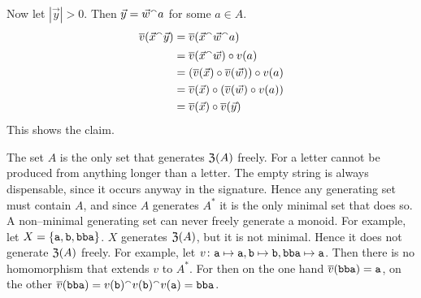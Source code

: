 Now let $|\vec{y}| > 0$. Then $\vec{y} = \vec{w} {^{\smallfrown}} a$
for some $a \in A$.
\begin{equation}
\begin{split}
\overline{v}(\vec{x} {^{\smallfrown}} \vec{y}) & = \overline{v}(\vec{x} {^{\smallfrown}} \vec{w} {^{\smallfrown}} a) \\
               &  = \overline{v}(\vec{x} {^{\smallfrown}} \vec{w}) \circ v(a) \\
               &  = (\overline{v}(\vec{x}) \circ \overline{v}(\vec{w})) \circ v(a) \\
               &  = \overline{v}(\vec{x}) \circ (\overline{v}(\vec{w}) \circ v(a)) \\
               &  = \overline{v}(\vec{x}) \circ \overline{v}(\vec{y}) \\
\end{split}
\end{equation}
This shows the claim.
\proofend

The set $A$ is the only set that generates $\mathfrak{Z}(A)$ freely. For
a letter cannot be produced from anything longer than a letter.
The empty string is always dispensable, since it occurs anyway
in the signature. Hence any generating set must contain $A$, and
since $A$ generates $A^{\ast}$ it is the only minimal set that
does so. A non--minimal generating set can
never freely generate a monoid. For example, let
$X = \{\mbox{\tt a}, \mbox{\tt b}, \mbox{\tt bba}\}$. 
$X$ generates $\mathfrak{Z}(A)$, but it is not minimal. Hence it does not
generate $\mathfrak{Z}(A)$ freely. For example, let $v \colon \mbox{\tt a} \mapsto
\mbox{\tt a}, \mbox{\tt b} \mapsto \mbox{\tt b}, \mbox{\tt bba}
\mapsto \mbox{\tt a}$. Then there is no homomorphism that extends
$v$ to $A^{\ast}$. For then on the one hand
$\overline{v}(\mbox{\tt bba}) = \mbox{\tt a}$, on the other
$\overline{v}(\mbox{\tt bba}) = v(\mbox{\tt b}) {^{\smallfrown}} v(\mbox{\tt b})
{^{\smallfrown}} v(\mbox{\tt a}) = \mbox{\tt bba}$.

